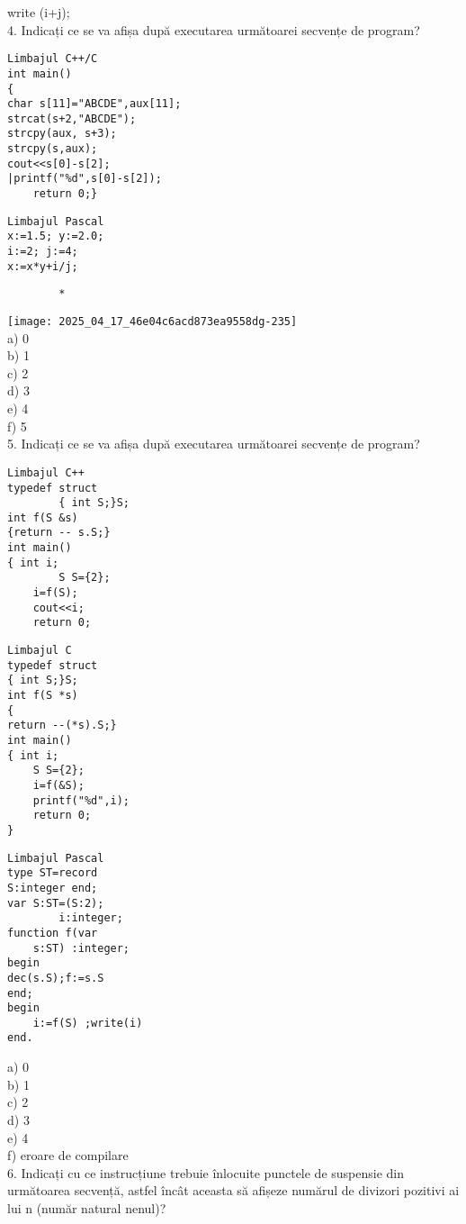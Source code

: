 write (i+j);\\
4. Indicați ce se va afișa după executarea următoarei secvențe de program?

\begin{verbatim}
Limbajul C++/C
int main()
{
char s[11]="ABCDE",aux[11];
strcat(s+2,"ABCDE");
strcpy(aux, s+3);
strcpy(s,aux);
cout<<s[0]-s[2];
|printf("%d",s[0]-s[2]);
    return 0;}
\end{verbatim}

\begin{verbatim}
Limbajul Pascal
x:=1.5; y:=2.0;
i:=2; j:=4;
x:=x*y+i/j;
\end{verbatim}

\begin{verbatim}
        *
\end{verbatim}

\texttt{[image: 2025\_04\_17\_46e04c6acd873ea9558dg-235]}\\
a) 0\\
b) 1\\
c) 2\\
d) 3\\
e) 4\\
f) 5\\
5. Indicați ce se va afișa după executarea următoarei secvențe de program?

\begin{verbatim}
Limbajul C++
typedef struct
        { int S;}S;
int f(S &s)
{return -- s.S;}
int main()
{ int i;
        S S={2};
    i=f(S);
    cout<<i;
    return 0;
\end{verbatim}

\begin{verbatim}
Limbajul C
typedef struct
{ int S;}S;
int f(S *s)
{
return --(*s).S;}
int main()
{ int i;
    S S={2};
    i=f(&S);
    printf("%d",i);
    return 0;
}
\end{verbatim}

\begin{verbatim}
Limbajul Pascal
type ST=record
S:integer end;
var S:ST=(S:2);
        i:integer;
function f(var
    s:ST) :integer;
begin
dec(s.S);f:=s.S
end;
begin
    i:=f(S) ;write(i)
end.
\end{verbatim}

a) 0\\
b) 1\\
c) 2\\
d) 3\\
e) 4\\
f) eroare de compilare\\
6. Indicați cu ce instrucțiune trebuie înlocuite punctele de suspensie din următoarea secvență, astfel încât aceasta să afișeze numărul de divizori pozitivi ai lui n (număr natural nenul)?

